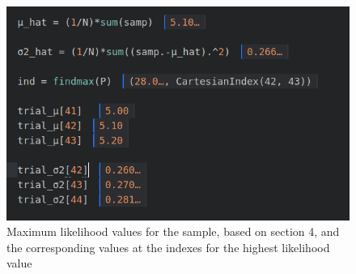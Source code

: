 \documentclass[a4paper,12pt,notitlepage]{article}
\begin{document}
\begin{figure}[h]
\centering
\includegraphics[width=13cm,8cm]{hatvalues.png}
\caption{Maximum likelihood values for the sample, based on section 4, and the corresponding values at the indexes for the highest likelihood value}
\end{figure}
\end{document}
